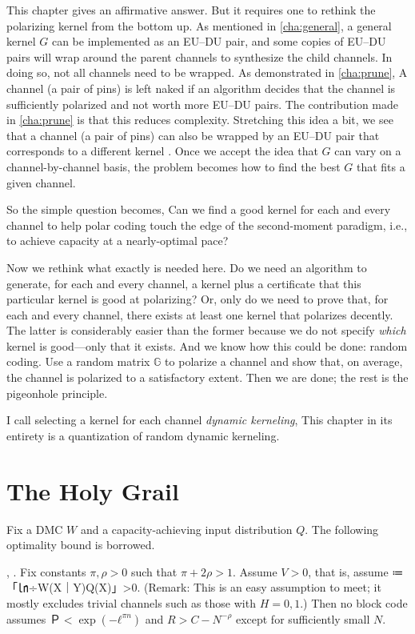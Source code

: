 \documentclass[openany]{amsbook}
\numberwithin{equation}{chapter}
\numberwithin{figure}{chapter}
\numberwithin{table}{chapter}
\def\[#1\]{\begin{equation*}{#1}\end{equation*}}
\theoremstyle{definition}	理dfn:Definition~?s			理exa:Example~?s
\theoremstyle{remark}		理cla:Claim~?s				理rem:Remark~?s
\begin{document}
	This chapter gives an affirmative answer.
	But it requires one to rethink the polarizing kernel from the bottom up.
	As mentioned in  \cref{cha:general}, a general kernel $G$
	can be implemented as an EU--DU pair, and some copies of EU--DU pairs
	will wrap around the parent channels to synthesize the child channels.
	In doing so, not all channels need to be wrapped.
	As demonstrated in \cref{cha:prune}, A channel (a pair of pins)
	is left naked if an algorithm decides that the channel is
	sufficiently polarized and not worth more EU--DU pairs.
	The contribution made in \cref{cha:prune} is that this reduces complexity.
	Stretching this idea a bit, we see that a channel (a pair of pins) can also be
	wrapped by an EU--DU pair that corresponds to a different kernel \cite{YB15}.
	Once we accept the idea that $G$ can vary on a channel-by-channel basis,
	the problem becomes how to find the best $G$ that fits a given channel.
	
	So the simple question becomes, Can we find a good kernel for each and every channel
	to help polar coding touch the edge of the second-moment paradigm,
	i.e., to achieve capacity at a nearly-optimal pace?
	
	Now we rethink what exactly is needed here.
	Do we need an algorithm to generate, for each and every channel, a kernel 
	plus a certificate that this particular kernel is good at polarizing?
	Or, only do we need to prove that, for each and every channel,
	there exists at least one kernel that polarizes decently.
	The latter is considerably easier than the former because we do not
	specify \emph{which} kernel is good---only that it exists.
	And we know how this could be done: random coding.
	Use a random matrix $𝔾$ to polarize a channel and show that,
	on average, the channel is polarized to a satisfactory extent.
	Then we are done;
	the rest is the pigeonhole principle.
	
	I call selecting a kernel for each channel \emph{dynamic kerneling},
	This chapter in its entirety is a quantization of random dynamic kerneling.

\section{The Holy Grail}

	Fix a DMC $W$ and a capacity-achieving input distribution $Q$.
	The following optimality bound is borrowed.
	
	\begin{thm}\label{pro:optimal}
		\cite[Theorem~2]{AW14}, \cite[Theorem~6]{PV10}.
		Fix constants $π,ρ>0$ such that $π+2ρ>1$.
		Assume $V>0$, that is, assume
		\[V≔「㏑÷{W(X｜Y)}{Q(X)}」>0.\]
		(Remark:
		This is an easy assumption to meet;
		it mostly excludes trivial channels such as those with $H=0,1$.)
		Then no block code assumes $Ｐ<\exp(-ℓ^{πn})$ and $R>C-N^{-ρ}$
		except for sufficiently small $N$.
	\end{thm}
	
\end{document}
